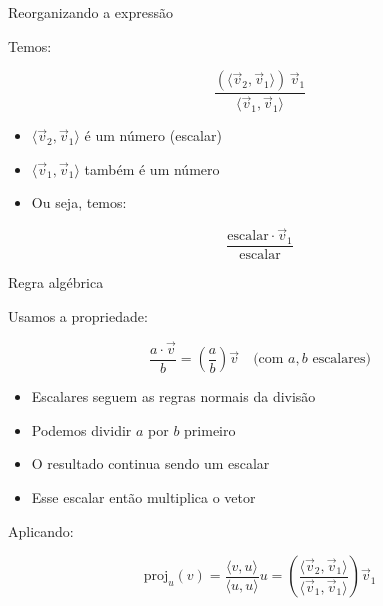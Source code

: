 \documentclass{beamer}
\begin{document}
\begin{frame}{Reorganizando a expressão}


\vspace{0.5cm}

Temos:

\[
\frac{(\langle \vec{v}_2 , \vec{v}_1 \rangle)\,\vec{v}_1}{\langle \vec{v}_1 , \vec{v}_1 \rangle}
\]

\vspace{0.5cm}

\begin{itemize}
    \item $\langle \vec{v}_2 , \vec{v}_1 \rangle$ é um número (escalar)
    \item $\langle \vec{v}_1 , \vec{v}_1 \rangle$ também é um número
\end{itemize}

\vspace{0.5cm}

\begin{itemize}
    \item Ou seja, temos:
\end{itemize}

\vspace{0.3cm}

\[
\frac{\text{escalar} \cdot \vec{v}_1}{\text{escalar}}
\]

\end{frame}
\begin{frame}{Regra algébrica}


\vspace{0.5cm}

Usamos a propriedade:

\[
\frac{a \cdot \vec{v}}{b} = \left(\frac{a}{b}\right)\vec{v}
\quad \text{(com $a,b$ escalares)}
\]

\vspace{0.5cm}

\begin{itemize}
    \item Escalares seguem as regras normais da divisão
    \item Podemos dividir $a$ por $b$ primeiro
    \item O resultado continua sendo um escalar
\end{itemize}

\vspace{0.5cm}

\begin{itemize}
    \item Esse escalar então multiplica o vetor
\end{itemize}

\vspace{0.5cm}

Aplicando:

\[
\text{proj}_{u}(v)= \frac {\langle v, u\rangle}{\langle u, u\rangle}u
=
\left(\frac{\langle \vec{v}_2 , \vec{v}_1 \rangle}{\langle \vec{v}_1, \vec{v}_1 \rangle}\right)\vec{v}_1
\]

\end{frame}
\end{document}
